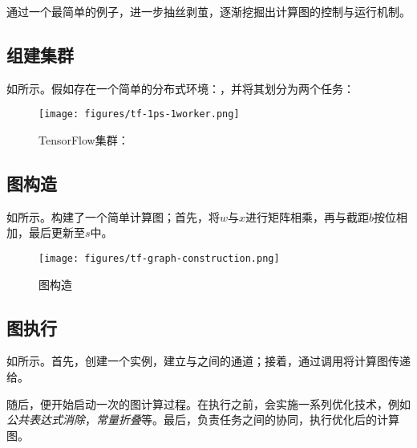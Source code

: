 \begin{content}

通过一个最简单的例子，进一步抽丝剥茧，逐渐挖掘出\tf{}计算图的控制与运行机制。

\subsection{组建集群}

如所示。假如存在一个简单的分布式环境：，并将其划分为两个任务：

\begin{enum}
\end{enum}

\begin{figure}[!htbp]
\centering
\texttt{[image: figures/tf-1ps-1worker.png]}
\caption{TensorFlow集群：}
 \label{fig:tf-1ps-1worker}
\end{figure}

\subsection{图构造}

如所示。构建了一个简单计算图；首先，将$w$与$x$进行矩阵相乘，再与截距$b$按位相加，最后更新至$s$中。

\begin{figure}[!htbp]
\centering
\texttt{[image: figures/tf-graph-construction.png]}
\caption{图构造}
 \label{fig:tf-graph-construction}
\end{figure}

\subsection{图执行}

如所示。首先，创建一个实例，建立与之间的通道；接着，通过调用将计算图传递给。

随后，便开始启动一次的图计算过程。在执行之前，会实施一系列优化技术，例如\emph{公共表达式消除}，\emph{常量折叠}等。最后，负责任务之间的协同，执行优化后的计算图。


\end{content}
